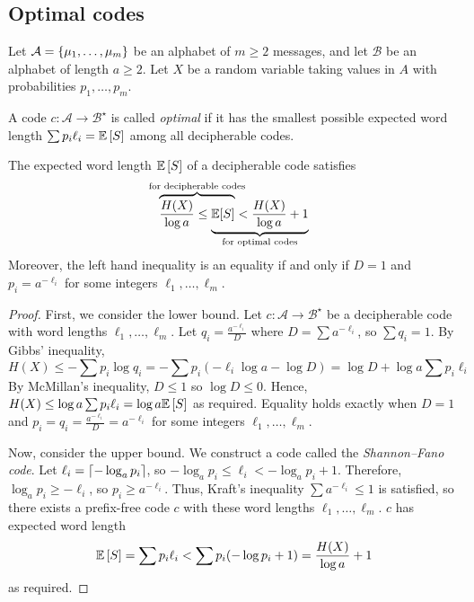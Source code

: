 \subsection{Optimal codes}
Let \( \mathcal A = \qty{\mu_1, \dots, \mu_m} \) be an alphabet of \( m \geq 2 \) messages, and let \( \mathcal B \) be an alphabet of length \( a \geq 2 \).
Let \( X \) be a random variable taking values in \( A \) with probabilities \( p_1, \dots, p_m \).
\begin{definition}
    A code \( c \colon \mathcal A \to \mathcal B^\star \) is called \emph{optimal} if it has the smallest possible expected word length \( \sum p_i \ell_i = \mathbb{E}\left[{S}\right] \) among all decipherable codes.
\end{definition}
\begin{theorem}
    The expected word length \( \mathbb{E}\left[{S}\right] \) of a decipherable code satisfies
    \[ \rlap{\(\overbrace{\phantom{\frac{H(X)}{\log a} \leq \mathbb E[S]}}^{\mathclap{\text{for decipherable codes}}}\)} \frac{H(X)}{\log a} \leq \underbrace{\mathbb E[S] < \frac{H(X)}{\log a} + 1}_{\mathclap{\text{for optimal codes}}} \]
    Moreover, the left hand inequality is an equality if and only if \( D = 1 \) and \( p_i = a^{-\ell_i} \) for some integers \( \ell_1, \dots, \ell_m \).
\end{theorem}
\begin{proof}
    First, we consider the lower bound.
    Let \( c \colon \mathcal A \to \mathcal B^\star \) be a decipherable code with word lengths \( \ell_1, \dots, \ell_m \).
    Let \( q_i = \frac{a^{-\ell_i}}{D} \) where \( D = \sum a^{-\ell_i} \), so \( \sum q_i = 1 \).
    By Gibbs' inequality,
    \[ H(X) \leq -\sum p_i \log q_i = -\sum p_i(-\ell_i \log a - \log D) = \log D + \log a \sum p_i \ell_i \]
    By McMillan's inequality, \( D \leq 1 \) so \( \log D \leq 0 \).
    Hence, \( H(X) \leq \log a \sum p_i \ell_i = \log a \mathbb{E}\left[{S}\right] \) as required.
    Equality holds exactly when \( D = 1 \) and \( p_i = q_i = \frac{a^{-\ell_i}}{D} = a^{-\ell_i} \) for some integers \( \ell_1, \dots, \ell_m \).

    Now, consider the upper bound.
    We construct a code called the \emph{Shannon--Fano code}.
    Let \( \ell_i = \lceil-\log_a p_i\rceil \), so \( -\log_a p_i \leq \ell_i < -\log_a p_i + 1 \).
    Therefore, \( \log_a p_i \geq -\ell_i \), so \( p_i \geq a^{-\ell_i} \).
    Thus, Kraft's inequality \( \sum a^{-\ell_i} \leq 1 \) is satisfied, so there exists a prefix-free code \( c \) with these word lengths \( \ell_1, \dots, \ell_m \).
    \( c \) has expected word length
    \[ \mathbb{E}\left[{S}\right] = \sum p_i \ell_i < \sum p_i (-\log p_i + 1) = \frac{H(X)}{\log a} + 1 \]
    as required.
\end{proof}
